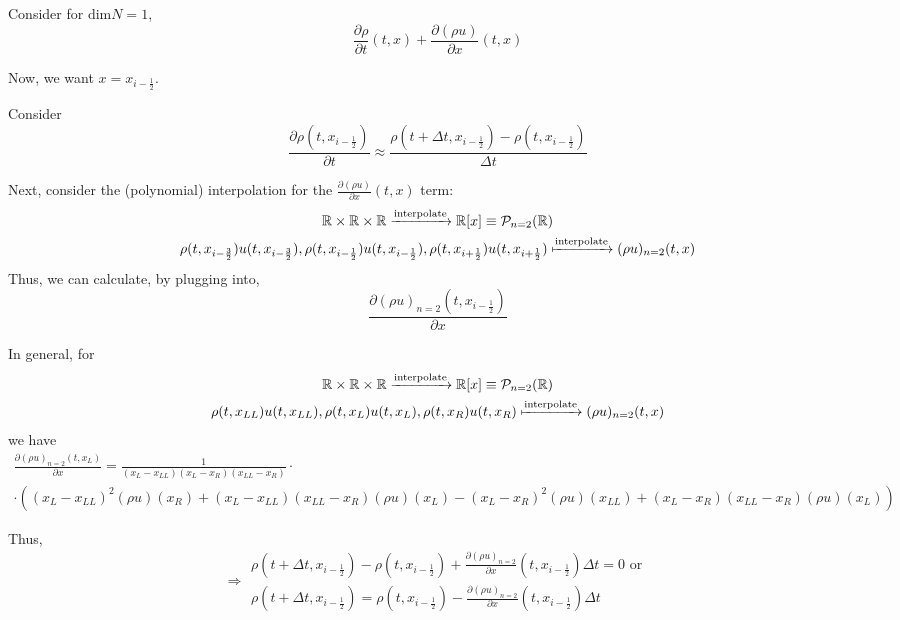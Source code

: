 \documentclass[10pt]{amsart}
\begin{document}
\begin{multicols*}{2}
Consider for $\text{dim}N=1$,
\[
\frac{ \partial \rho}{ \partial t}(t,x) + \frac{ \partial (\rho u) }{ \partial x}(t,x)
\]

Now, we want $x = x_{i-\frac{1}{2} }$.

Consider
\[
\frac{ \partial \rho(t,x_{i-\frac{1}{2} }) }{ \partial t} \approx \frac{ \rho(t+\Delta t,x_{i-\frac{1}{2} })  - \rho(t,x_{i-\frac{1}{2} } ) }{\Delta t}
\]

Next, consider the (polynomial) interpolation for the $ \frac{ \partial (\rho u) }{ \partial x}(t,x)$ term:
\[
\begin{gathered}
  \mathbb{R} \times \mathbb{R}\times\mathbb{R} \xrightarrow{ \text{interpolate} } \mathbb{R}[x] \equiv \mathcal{P}_{n=2}(\mathbb{R}) \\ 
 \rho(t,x_{i-\frac{3}{2} } ) u(t,x_{i-\frac{3}{2} }) , \rho(t,x_{i-\frac{1}{2} })u(t,x_{i-\frac{1}{2} } ), \rho(t,x_{i+\frac{1}{2} })u(t,x_{i+\frac{1}{2} } ) \xmapsto{ \text{interpolate} } (\rho u)_{n=2}(t,x)
  \end{gathered}
\]
Thus, we can calculate, by plugging into,
\[
\frac{ \partial (\rho u)_{n=2}(t,x_{i-\frac{1}{2} } ) }{ \partial x}
\]

In general, for
\[
\begin{gathered}
  \mathbb{R} \times \mathbb{R}\times\mathbb{R} \xrightarrow{ \text{interpolate} } \mathbb{R}[x] \equiv \mathcal{P}_{n=2}(\mathbb{R}) \\ 
 \rho(t,x_{LL } ) u(t,x_{LL }) , \rho(t,x_{L })u(t,x_{L } ), \rho(t,x_{R })u(t,x_{R } ) \xmapsto{ \text{interpolate} } (\rho u)_{n=2}(t,x)
  \end{gathered}
\]
we have
\[
\begin{gathered}
  \frac{ \partial (\rho u)_{n=2}(t,x_{L } ) }{ \partial x} = 
  \frac{1}{\left(x_{L} - x_{LL}\right) \left(x_{L} - x_{R}\right) \left(x_{LL} - x_{R}\right)} \cdot \\
  \cdot \left(\left(x_{L} - x_{LL}\right)^{2} (\rho u){\left (x_{R} \right )} + \left(x_{L} - x_{LL}\right) \left(x_{LL} - x_{R}\right) (\rho u){\left (x_{L} \right )} - \left(x_{L} - x_{R}\right)^{2} (\rho u){\left (x_{LL} \right )} + \left(x_{L} - x_{R}\right) \left(x_{LL} - x_{R}\right) (\rho u){\left (x_{L} \right )}\right)
\end{gathered}
\]

Thus,
\begin{equation}
\Longrightarrow \begin{gathered}
  \rho(t+\Delta t, x_{i-\frac{1}{2} } ) - \rho(t,x_{i-\frac{1}{2} } ) + \frac{ \partial (\rho u)_{n=2} }{\partial x}(t,x_{i-\frac{1}{2} } )\Delta t = 0  \text{ or } \\
  \rho(t+\Delta t,x_{i-\frac{1}{2} } ) = \rho(t,x_{i-\frac{1}{2} } ) - \frac{ \partial (\rho u)_{n=2} }{ \partial x}(t,x_{i-\frac{1}{2} })\Delta t
  \end{gathered}
\end{equation}


\end{multicols*}
\end{document}
